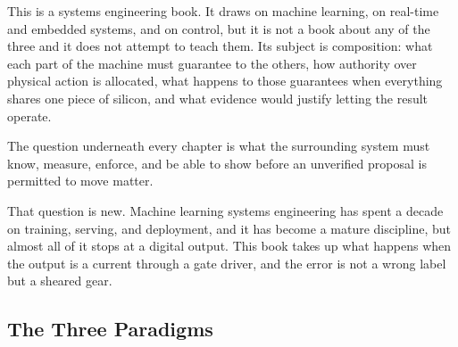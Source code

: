 \documentclass[
  9pt,
  letterpaper,
  open=right,
  numbers=noenddot,
  captions=tableheading]{scrbook}
\makeatletter
\newif\ifmlsys@inside@longtable
\newif\ifmlsys@longtable@numbered
\let\mlsys@orig@label\label
\renewcommand{\label}[1]{%
  \ifmlsys@inside@longtable
    \global\mlsys@longtable@numberedtrue
  \fi
  \mlsys@orig@label{#1}%
}
\let\label\mlsys@orig@label
\makeatother
\begin{document}

This is a systems engineering book. It draws on machine learning, on
real-time and embedded systems, and on control, but it is not a book
about any of the three and it does not attempt to teach them. Its
subject is composition: what each part of the machine must guarantee to
the others, how authority over physical action is allocated, what
happens to those guarantees when everything shares one piece of silicon,
and what evidence would justify letting the result operate.

The question underneath every chapter is what the surrounding system
must know, measure, enforce, and be able to show before an unverified
proposal is permitted to move matter.

That question is new. Machine learning systems engineering has spent a
decade on training, serving, and deployment, and it has become a mature
discipline, but almost all of it stops at a digital output. This book
takes up what happens when the output is a current through a gate
driver, and the error is not a wrong label but a sheared gear.

\subsection*{The Three Paradigms}\label{the-three-paradigms}
\end{document}
